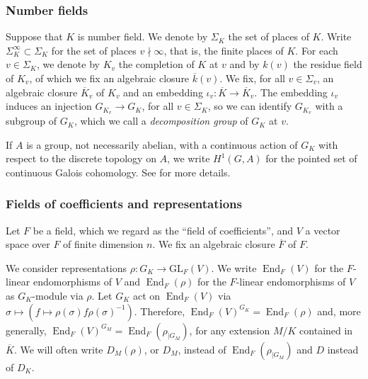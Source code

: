 \documentclass[a4paper,10pt]{amsart}
\theoremstyle{plain}
\theoremstyle{definition}
\theoremstyle{remark}
\def\C{\mathbf C}
\def\Q{\mathbf Q}
\def\Z{\mathbf Z}
\def\R{\mathbf R}
\def\GL{\mathrm{GL}}
\def\mr#1{\mathrm{#1}}
\def\Frob{\mr{Frob}}
\DeclareMathOperator{\Gal}{Gal}
\DeclareMathOperator{\End}{End}
\def\Cp{\C_p}
\begin{document}
\subsubsection*{Number fields} Suppose that \(K\) is number field. We denote by \(\Sigma_K\) the set of places of \(K\). Write \(\Sigma^\infty_K \subset \Sigma_K\) for the set of places \(v \nmid \infty\), that is, the finite places of \(K\). For each \(v \in \Sigma_K\), we denote by \(K_v\) the completion of \(K\) at \(v\) and by \(k(v)\) the residue field of \(K_v\), of which we fix an algebraic closure \(\overline{k}(v)\). We fix, for all \(v \in \Sigma_v\), an algebraic closure \(\overline{K}_v\) of \(K_v\) and an embedding \(\iota_v \colon \overline{K} \to \overline{K}_v\). The embedding \(\iota_v\) induces an injection \(G_{K_v} \to G_K\), for all \(v \in \Sigma_K\), so we can identify \(G_{K_v}\) with a subgroup of \(G_K\),  which we call a \emph{decomposition group} of \(G_K\) at \(v\).

If \(A\) is a group, not necessarily abelian, with a continuous action of \(G_K\) with respect to the discrete topology on \(A\), we write \(H^1(G, A)\) for the pointed set of continuous Galois cohomology. See \cite[\S5]{Serre-Galois} for more details.


\subsubsection*{Fields of coefficients and representations} Let \(F\) be a field, which we regard as the ``field of coefficients'', and \(V\) a vector space over \(F\) of finite dimension \(n\). We fix an algebraic closure \(\overline{F}\) of \(F\). %

We consider representations \(\rho\colon G_K \to \GL_F(V)\). We write \(\End_F(V)\) for the \(F\)-linear endomorphisms of \(V\) and \(\End_F(\rho)\) for the 
\(F\)-linear endomorphisms of \(V\) as \(G_K\)-module via \(\rho\). Let \(G_K\) act on \(\End_F(V)\) via \(\sigma \mapsto (f\mapsto \rho(\sigma)f\rho(\sigma)^{-1})\). Therefore, \(\End_F(V)^{G_K}=\End_F(\rho)\) and, more generally, \(\End_F(V)^{G_M}=\End_F(\rho_{|G_M})\),
for any extension \(M/K\) contained in \(\overline{K}\). %
We will  often write \(D_M(\rho)\), or \(D_M\), instead of \(\End_F(\rho_{|G_M})\) and \(D\) instead of \(D_K\).
\end{document}
